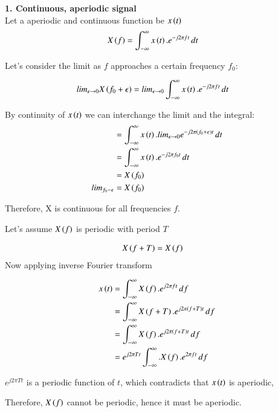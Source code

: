 \documentclass[journal,12pt,onecolumn]{IEEEtran}
\theoremstyle{remark}
\begin{document}
\textbf{1. Continuous, aperiodic signal}\\


Let a aperiodic and continuous function be $x\left(t\right)$
\begin{align}
X\left(f\right)&=\int_{-\infty}^{\infty} x\left(t\right).e^{-j2\pi ft}\,dt
\end{align}

Let's consider the limit as $f$ approaches a certain frequency $f_0$:

\begin{align}
lim_{\epsilon \rightarrow 0}X\left(f_0+\epsilon\right)&= lim_{\epsilon \rightarrow 0}\int_{-\infty}^{\infty} x\left(t\right).e^{-j2\pi ft}\,dt
\end{align}

By continuity of $x\left(t\right)$ we can interchange the limit and the integral:
\begin{align}
&=\int_{-\infty}^{\infty} x\left(t\right).lim_{\epsilon\rightarrow0}e^{-j2\pi\left(f_0+\epsilon\right)t}\,dt\\
&=\int_{-\infty}^{\infty} x\left(t\right).e^{-j2\pi f_0 t}\,dt\\
&=X\left(f_0\right)\\
 lim_{f_0-\epsilon}&=X\left(f_0\right)
\end{align}

Therefore, X is continuous for all frequencies $f$.

Let's assume $X\left(f\right)$ is periodic with period $T$ 

\begin{align}
X\left(f+T\right)&=X\left(f\right)
\end{align}
Now applying inverse Fourier transform

\begin{align}
x\left(t\right)&=\int_{-\infty}^{\infty} X\left(f\right).e^{j2\pi ft}\,df\\
&=\int_{-\infty}^{\infty} X\left(f+T\right).e^{j2\pi \left(f+T\right)t}\,df\\
&=\int_{-\infty}^{\infty} X\left(f\right).e^{j2\pi \left(f+T\right)t}\,df\\
&=e^{j2\pi Tt}\int_{-\infty}^{\infty}.X\left(f\right).e^{2\pi ft}\, df
\end{align}

$e^{j2\pi Tt}$ is a periodic function of $t$, which contradicts that $x\left(t\right)$ is aperiodic,

Therefore, $X\left(f\right)$ cannot be periodic, hence it must be aperiodic.

\vspace{2mm}
\end{document}
